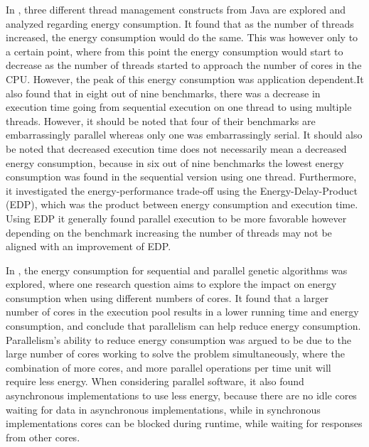 In \cite{Pinto2014}, three different thread management constructs from Java are explored and analyzed regarding energy consumption. It found that as the number of threads increased, the energy consumption would do the same. This was however only to a certain point, where from this point the energy consumption would start to decrease as the number of threads started to approach the number of cores in the CPU. However, the peak of this energy consumption was application dependent.It also found that in eight out of nine benchmarks, there was a decrease in execution time going from sequential execution on one thread to using multiple threads. However, it should be noted that four of their benchmarks are embarrassingly parallel whereas only one was embarrassingly serial. It should also be noted that decreased execution time does not necessarily mean a decreased energy consumption, because in six out of nine benchmarks the lowest energy consumption was found in the sequential version using one thread. Furthermore, it investigated the energy-performance trade-off using the Energy-Delay-Product (EDP), which was the product between energy consumption and execution time. Using EDP it generally found parallel execution to be more favorable however depending on the benchmark increasing the number of threads may not be aligned with an improvement of EDP.\cite{Pinto2014}

In \cite{abdelhafez2019}, the energy consumption for sequential and parallel genetic algorithms was explored, where one research question aims to explore the impact on energy consumption when using different numbers of cores. It found that a larger number of cores in the execution pool results in a lower running time and energy consumption, and conclude that parallelism can help reduce energy consumption. Parallelism's ability to reduce energy consumption was argued to be due to the large number of cores working to solve the problem simultaneously, where the combination of more cores, and more parallel operations per time unit will require less energy. When considering parallel software, it also found asynchronous implementations to use less energy, because there are no idle cores waiting for data in asynchronous implementations, while in synchronous implementations cores can be blocked during runtime, while waiting for responses from other cores. 


